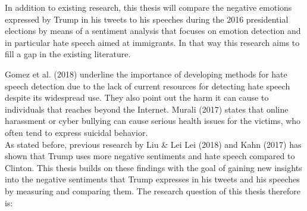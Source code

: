 \documentclass[a4paper,pdf]{article} %
\begin{document}

In addition to existing research, this thesis will compare the negative emotions expressed by Trump in his tweets to his speeches during the 2016 presidential elections by means of a sentiment analysis that focuses on emotion detection and in particular hate speech aimed at immigrants. In that way this research aims to fill a gap in the existing literature. 

Gomez et al. (2018) underline the importance of developing methods for hate speech detection due to the lack of current resources for detecting hate speech despite its widespread use. They also point out the harm it can cause to individuals that reaches beyond the Internet. Murali (2017) states that online harassment or cyber bullying can cause serious health issues for the victims, who often tend to express suicidal behavior. \\




As stated before, previous research by Liu \& Lei Lei (2018) and Kahn (2017) has shown that Trump uses more negative sentiments and hate speech compared to Clinton. This thesis builds on these findings with the goal of gaining new insights into the negative sentiments that Trump expresses in his tweets and his speeches by measuring and comparing them. The research question of this thesis therefore is:\\
\end{document}
